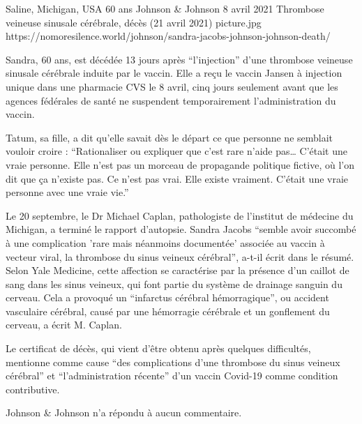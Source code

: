 {Saline, Michigan, USA}
{60 ans}
{Johnson \& Johnson }
{8 avril 2021}
{Thrombose veineuse sinusale cérébrale, décès (21 avril 2021)}
{picture.jpg}
{https://nomoresilence.world/johnson/sandra-jacobs-johnson-johnson-death/}
{

Sandra, 60 ans, est décédée 13 jours après “l'injection” d'une thrombose
veineuse sinusale cérébrale induite par le vaccin. Elle a reçu le vaccin Jansen
à injection unique dans une pharmacie CVS le 8 avril, cinq jours seulement avant
que les agences fédérales de santé ne suspendent temporairement l'administration
du vaccin.

Tatum, sa fille, a dit qu'elle savait dès le départ ce que personne ne semblait
vouloir croire : “Rationaliser ou expliquer que c'est rare n'aide pas… C'était
une vraie personne. Elle n'est pas un morceau de propagande politique fictive,
où l'on dit que ça n'existe pas. Ce n'est pas vrai. Elle existe
vraiment. C'était une vraie personne avec une vraie vie.”

Le 20 septembre, le Dr Michael Caplan, pathologiste de l'institut de médecine du
Michigan, a terminé le rapport d'autopsie. Sandra Jacobs “semble avoir succombé
à une complication 'rare mais néanmoins documentée' associée au vaccin à vecteur
viral, la thrombose du sinus veineux cérébral”, a-t-il écrit dans le
résumé. Selon Yale Medicine, cette affection se caractérise par la présence d'un
caillot de sang dans les sinus veineux, qui font partie du système de drainage
sanguin du cerveau. Cela a provoqué un “infarctus cérébral hémorragique”, ou
accident vasculaire cérébral, causé par une hémorragie cérébrale et un
gonflement du cerveau, a écrit M. Caplan.

Le certificat de décès, qui vient d'être obtenu après quelques difficultés,
mentionne comme cause “des complications d'une thrombose du sinus veineux
cérébral” et “l'administration récente” d'un vaccin Covid-19 comme condition
contributive.

Johnson \& Johnson n'a répondu à aucun commentaire.

}

